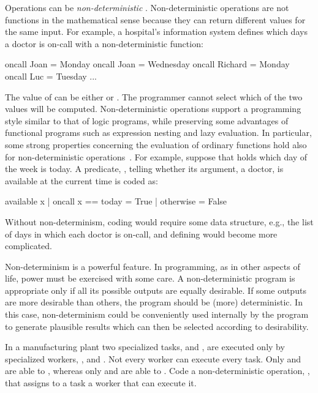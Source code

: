 Operations can be
\emph{non-deterministic}%
.
Non-deterministic operations are not functions in the mathematical sense
because they can return different values for the same input.
For example, a hospital's information system defines which
days a doctor is on-call with a non-deterministic function:
%
\begin{curry}
oncall Joan    = Monday
oncall Joan    = Wednesday
oncall Richard = Monday
oncall Luc     = Tuesday
...
\end{curry}
%
The value of  can be either
 or .
The programmer cannot select which of the two values will be computed.
Non-deterministic operations support a programming style similar
to that of logic programs, while preserving some advantages of functional
programs such as expression nesting and lazy evaluation.
In particular, some strong properties concerning the evaluation
of ordinary functions
hold also for non-deterministic operations~\cite{Antoy97ALP}.
For example, suppose that  holds which day of
the week is today.
A predicate, , telling whether
its argument, a doctor, is available at the current time is coded as:
%
\begin{curry}
available x | oncall x == today = True
            | otherwise         = False
\end{curry}
%
Without non-determinism, coding 
would require some data structure, e.g., 
the list of days in which each doctor is on-call,
and defining  would become more complicated.

Non-determinism is a powerful feature.
In programming,
as in other aspects of life, power must be exercised with some care.
A non-deterministic program is appropriate 
only if all its possible outputs are equally desirable.
If some outputs are more desirable than others,
the program should be (more) deterministic.
In this case,
non-determinism could be conveniently used internally by the program
to generate plausible results
which can then be selected according to desirability.

\begin{exercise}
\label{ex_nondettask}
In a manufacturing plant two specialized tasks,
 and ,
are executed only by specialized workers,
,  and .
Not every worker can execute every task.
Only  and  are able to
, whereas only  and 
are able to .
Code a non-deterministic operation, ,
that assigns to a task a worker that can execute it.
\end{exercise}


